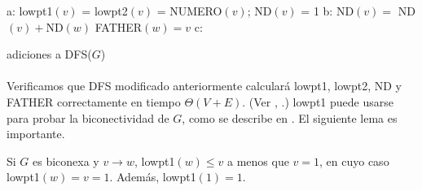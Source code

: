 \begin{algorithm}[!ht]
\DontPrintSemicolon
a: lowpt1$\left(v\right)$ = lowpt2$\left(v\right)$ = NUMERO$\left(v\right)$; \;
\hspace{0.4cm} ND$\left(v\right)$ = 1 \;
b: 
\hspace{0.4cm} 
\hspace{0.4cm} 
\hspace{0.4cm} ND$\left(v\right) = $ ND$\left(v\right) + $ND$\left(w\right)$\;
\hspace{0.4cm} FATHER$\left(w\right) = v$\;
c: 
\hspace{0.4cm} 
\caption{adiciones a DFS($G$)}\label{alg:adicionales a DFS}
\end{algorithm}

\paragraph{}
Verificamos que DFS modificado anteriormente calculará lowpt1, lowpt2, ND y FATHER correctamente en tiempo $\Theta\left(V + E\right)$. (Ver \citep{ept}, \citep{tarjan-1972}.) lowpt1 puede usarse para probar la biconectividad de $G$, como se describe en \citep{4569669}. El siguiente lema es importante.

\begin{lemma}
Si $G$ es biconexa y $v \rightarrow w$, lowpt1$\left(w\right) \le v$ a menos que $v=1$, en cuyo caso lowpt1$\left(w\right) = v = 1$. Además, lowpt1$\left(1\right) = 1$.
\label{lema:3.7}
\end{lemma}

